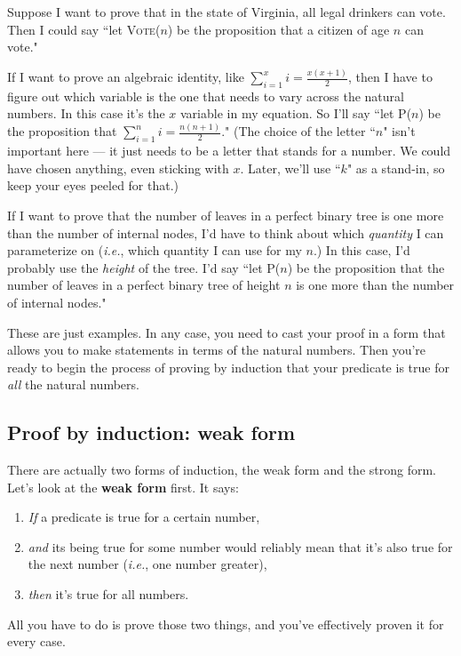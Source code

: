 Suppose I want to prove that in the state of Virginia, all legal drinkers
can vote. Then I could say ``let \textsc{Vote}($n$) be the proposition that
a citizen of age $n$ can vote."

If I want to prove an algebraic identity, like $\sum\limits_{i=1}^x{i} =
\frac{x(x+1)}{2}$, then I have to figure out which variable is the one that
needs to vary across the natural numbers. In this case it's the $x$
variable in my equation. So I'll say ``let P($n$) be the proposition that
$\sum\limits_{i=1}^n{i} = \frac{n(n+1)}{2}$." (The choice of the letter ``$n$"
isn't important here --- it just needs to be a letter that stands for a
number. We could have chosen anything, even sticking with $x$. Later, we'll
use ``$k$" as a stand-in, so keep your eyes peeled for that.)

If I want to prove that the number of leaves in a perfect binary tree is
one more than the number of internal nodes, I'd have to think about which
\textit{quantity} I can parameterize on (\textit{i.e.}, which quantity I
can use for my $n$.) In this case, I'd probably use the \textit{height} of
the tree. I'd say ``let P($n$) be the proposition that the number of leaves
in a perfect binary tree of height $n$ is one more than the number of
internal nodes."

These are just examples. In any case, you need to cast your proof in a form
that allows you to make statements in terms of the natural numbers. Then
you're ready to begin the process of proving by induction that your
predicate is true for \textit{all} the natural numbers.

\subsection{Proof by induction: weak form}

There are actually two forms of induction, the weak form and the strong
form. Let's look at the \textbf{weak form} first. It says:
\begin{enumerate}
\item \label{basecaseweak} \textit{If} a predicate is true for a certain number,
\item \label{inductivestepweak} \textit{and} its being true for some number
would reliably mean that it's also true for the next number (\textit{i.e.},
one number greater), 
\item \textit{then} it's true for all numbers.
\end{enumerate}
All you have to do is prove those two things, and you've effectively proven
it for every case.

